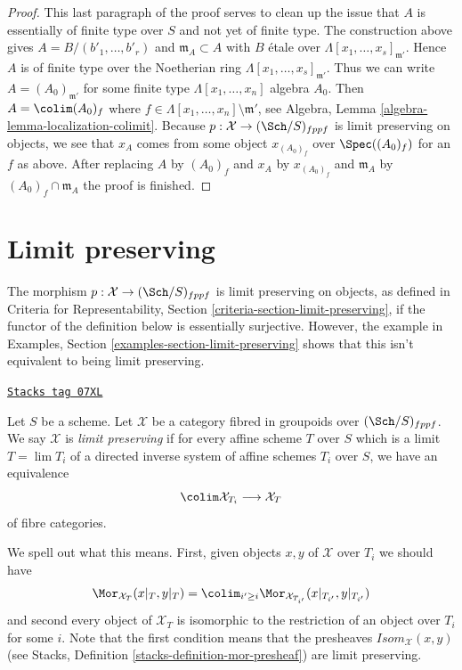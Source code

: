 \begin{proof}
\medskip\noindent
This last paragraph of the proof serves to clean up the issue that $A$ is
essentially of finite type over $S$ and not yet of finite type.
The construction above gives $A = B/(b'_1, \ldots, b'_r)$ and
$\mathfrak m_A \subset A$ with $B$ \'etale over
$\Lambda[x_1, \ldots, x_s]_{\mathfrak m'}$. Hence $A$ is of finite
type over the Noetherian ring $\Lambda[x_1, \ldots, x_s]_{\mathfrak m'}$.
Thus we can write $A = (A_0)_{\mathfrak m'}$ for some finite type
$\Lambda[x_1, \ldots, x_n]$ algebra $A_0$. Then
$A = \colim (A_0)_f$ where
$f \in \Lambda[x_1, \ldots, x_n] \setminus \mathfrak m'$, see
Algebra, Lemma \ref{algebra-lemma-localization-colimit}.
Because $p : \mathcal{X} \to (\Sch/S)_{fppf}$ is limit preserving on
objects, we see that
$x_A$ comes from some object $x_{(A_0)_f}$ over $\Spec((A_0)_f)$ for
an $f$ as above. After replacing $A$ by $(A_0)_f$ and $x_A$ by
$x_{(A_0)_f}$ and $\mathfrak m_A$ by $(A_0)_f \cap \mathfrak m_A$
the proof is finished.
\end{proof}

\section{Limit preserving}
\label{artin-section-limits}
The morphism $p : \mathcal{X} \to (\Sch/S)_{fppf}$ is limit preserving
on objects, as defined in Criteria for Representability, Section
\ref{criteria-section-limit-preserving}, if the functor of the definition
below is essentially surjective. However, the example
in Examples, Section \ref{examples-section-limit-preserving}
shows that this isn't equivalent to being limit preserving.

\begin{definition}
\label{artin-definition-limit-preserving}
\href{https://stacks.math.columbia.edu/tag/07XL}{\texttt{Stacks tag 07XL}}

Let $S$ be a scheme. Let $\mathcal{X}$ be a category fibred in groupoids
over $(\Sch/S)_{fppf}$. We say $\mathcal{X}$ is {\it limit preserving}
if for every affine scheme $T$ over $S$ which is a limit $T = \lim T_i$
of a directed inverse system of affine schemes $T_i$ over $S$, we have
an equivalence
$$
\colim \mathcal{X}_{T_i} \longrightarrow \mathcal{X}_T
$$
of fibre categories.
\end{definition}

We spell out what this means. First, given objects $x, y$ of $\mathcal{X}$
over $T_i$ we should have
$$
\Mor_{\mathcal{X}_T}(x|_T, y|_T) =
\colim_{i' \geq i} \Mor_{\mathcal{X}_{T_{i'}}}(x|_{T_{i'}}, y|_{T_{i'}})
$$
and second every object of $\mathcal{X}_T$ is isomorphic to the restriction
of an object over $T_i$ for some $i$. Note that the first condition means
that the presheaves $\mathit{Isom}_\mathcal{X}(x, y)$ (see
Stacks, Definition \ref{stacks-definition-mor-presheaf})
are limit preserving.

